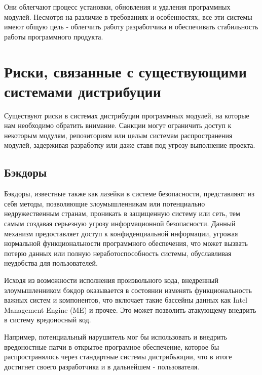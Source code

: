 Они облегчают процесс установки, обновления и удаления программных модулей. Несмотря на различие в требованиях и особенностях, все эти системы имеют общую цель - облегчить работу разработчика и обеспечивать стабильность работы программного продукта.

\section{Риски, связанные с существующими системами дистрибуции}

Существуют риски в системах дистрибуции программных модулей, на которые нам необходимо обратить внимание. Санкции могут ограничить доступ к некоторым модулям, репозиториям или целым системам распространения модулей, задерживая разработку или даже ставя под угрозу выполнение проекта.

\subsection{Бэкдоры}


Бэкдоры, известные также как лазейки в системе безопасности, представляют из себя методы, позволяющие злоумышленникам или потенциально недружественным странам, проникать в защищенную систему или сеть, тем самым создавая серьезную угрозу информационной безопасности. Данный механизм предоставляет доступ к конфиденциальной информации, угрожая нормальной функциональности программного обеспечения, что может вызвать потерю данных или полную неработоспособность системы, обуславливая неудобства для пользователей.

Исходя из возможности исполнения произвольного кода, внедренный злоумышленником бэкдор оказывается в состоянии изменять функциональность важных систем и компонентов, что включает такие бассейны данных как Intel Management Engine (ME) и прочее. Это может позволить атакующему внедрить в систему вредоносный код.

Например, потенциальный нарушитель мог бы использовать и внедрить вредоностные патчи в открытое програмное обеспечение, которое бы распространялось через стандартные системы дистрибьюции, что в итоге достигнет своего разработчика и в дальнейшем - пользователя. 

